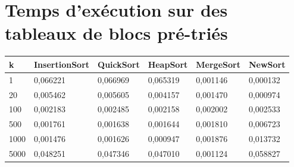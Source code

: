 \documentclass[a4paper, 11pt, oneside]{article}
\begin{document}
\section{Temps d'exécution sur des tableaux de blocs pré-triés}
\begin{table}[htb]
\begin{tabular}{llllll}
\hline
k    & InsertionSort & QuickSort & HeapSort & MergeSort & NewSort \\ \hline
1    & 0,066221              & 0,066969          & 0,065319         & 0,001146          & 0,000132        \\
20   & 0,005462              & 0,005605          & 0,004157         & 0,001470          & 0,000974        \\
100  & 0,002183              & 0,002485          & 0,002158         & 0,002002          & 0,002533        \\
500  & 0,001761              & 0,001638          & 0,001644         & 0,001810          & 0,006723        \\
1000 & 0,001476              & 0,001626          & 0,000947         & 0,001876          & 0,013732        \\
5000 & 0,048251              & 0,047346          & 0,047010         & 0,001124          & 0,058827       
\end{tabular}
\end{table}
\end{document}
